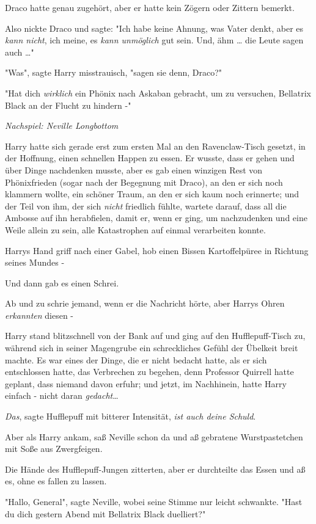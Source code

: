 {Draco hatte genau zugehört, aber er hatte kein Zögern oder Zittern bemerkt.

Also nickte Draco und sagte: "Ich habe keine Ahnung, was Vater denkt, aber es \emph{kann nicht}, ich meine, es \emph{kann unmöglich} gut sein. Und, ähm … die Leute sagen auch …"

"Was", sagte Harry misstrauisch, "sagen sie denn, Draco?"

"Hat dich \emph{wirklich} ein Phönix nach Askaban gebracht, um zu versuchen, Bellatrix Black an der Flucht zu hindern -"

\emph{Nachspiel: Neville Longbottom}

Harry hatte sich gerade erst zum ersten Mal an den Ravenclaw-Tisch gesetzt, in der Hoffnung, einen schnellen Happen zu essen. Er wusste, dass er gehen und über Dinge nachdenken musste, aber es gab einen winzigen Rest von Phönixfrieden (sogar nach der Begegnung mit Draco), an den er sich noch klammern wollte, ein schöner Traum, an den er sich kaum noch erinnerte; und der Teil von ihm, der sich \emph{nicht} friedlich fühlte, wartete darauf, dass all die Ambosse auf ihn herabfielen, damit er, wenn er ging, um nachzudenken und eine Weile allein zu sein, alle Katastrophen auf einmal verarbeiten konnte.

Harrys Hand griff nach einer Gabel, hob einen Bissen Kartoffelpüree in Richtung seines Mundes -

Und dann gab es einen Schrei.

Ab und zu schrie jemand, wenn er die Nachricht hörte, aber Harrys Ohren \emph{erkannten} diesen -

Harry stand blitzschnell von der Bank auf und ging auf den Hufflepuff-Tisch zu, während sich in seiner Magengrube ein schreckliches Gefühl der Übelkeit breit machte. Es war eines der Dinge, die er nicht bedacht hatte, als er sich entschlossen hatte, das Verbrechen zu begehen, denn Professor Quirrell hatte geplant, dass niemand davon erfuhr; und jetzt, im Nachhinein, hatte Harry einfach - nicht daran \emph{gedacht}…

\emph{Das}, sagte Hufflepuff mit bitterer Intensität, \emph{ist auch deine Schuld}.

Aber als Harry ankam, saß Neville schon da und aß gebratene Wurstpastetchen mit Soße aus Zwergfeigen.

Die Hände des Hufflepuff-Jungen zitterten, aber er durchteilte das Essen und aß es, ohne es fallen zu lassen.

"Hallo, General", sagte Neville, wobei seine Stimme nur leicht schwankte. "Hast du dich gestern Abend mit Bellatrix Black duelliert?"

}
